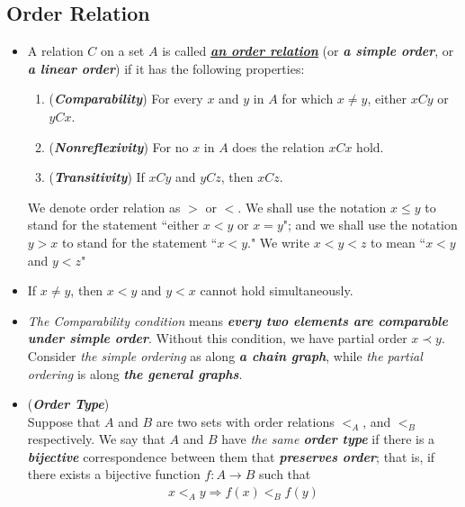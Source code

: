 \documentclass[11pt]{article}
\begin{document}
\subsection{Order Relation}
\begin{itemize}
\item  \begin{definition}
A relation $C$ on a set $A$ is called \underline{\emph{\textbf{an order relation}}} (or \emph{\textbf{a simple order}}, or \emph{\textbf{a linear order}})
if it has the following properties:
\begin{enumerate}
\item (\emph{\textbf{Comparability}}) For every $x$ and $y$ in $A$ for which $x \neq y$, either $xCy$ or $yCx$.
\item (\emph{\textbf{Nonreflexivity}}) For no $x$ in $A$ does the relation $xCx$ hold.
\item (\emph{\textbf{Transitivity}}) If $xCy$ and $yCz$, then $xCz$.
\end{enumerate}
We denote order relation as $>$ or $<$. We shall use the notation $x \le y$ to stand for the statement ``either $x < y$ or $x = y$";
and we shall use the notation $y > x$ to stand for the statement ``$x < y$." We write $x < y < z$ to mean ``$x < y$ and $y < z$"
\end{definition}

\item \begin{remark}
If $x \neq y$, then $x < y$ and $y < x$ cannot hold simultaneously.
\end{remark}

\item \begin{remark}
\emph{The Comparability condition} means \emph{\textbf{every two elements are comparable under simple order}}. Without this condition, we have partial order $x \prec y$. Consider \emph{the simple ordering} as along \emph{\textbf{a chain graph}}, while \emph{the partial ordering} is along \emph{\textbf{the general graphs}}.
\end{remark}

\item \begin{definition} (\textbf{\emph{Order Type}})\\
Suppose that $A$ and $B$ are two sets with order relations $<_A$, and $<_B$ respectively. We say that $A$ and $B$ have \emph{the same \textbf{order type}} if there is a \emph{\textbf{bijective}} correspondence between them that \emph{\textbf{preserves order}}; that is, if there exists a bijective
function $f : A \rightarrow B$ such that
\begin{align*}
x <_{A} y \Rightarrow f(x) <_B f(y)
\end{align*}
\end{definition}


\end{itemize}
\end{document}
